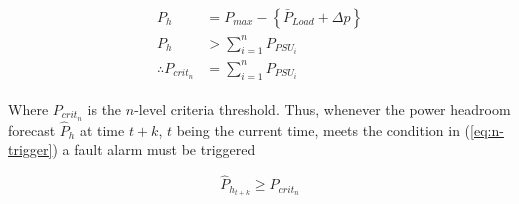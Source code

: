 \begin{align}
	\begin{split}
		P_{h} &= P_{max} - \left\{\bar{P}_{Load} + \Delta p \right\} \\
		P_{h} &> \sum_{i=1}^{n}{P_{PSU_i}} \\
		\therefore P_{crit_n} &= \sum_{i=1}^{n}{P_{PSU_i}}
	\end{split}
\end{align} 

Where $ P_{crit_n}$ is the $n$-level criteria threshold. Thus, whenever the power headroom forecast $\hat{P}_h$ at time $t+k$, $t$ being the current time, meets the condition in (\ref{eq:n-trigger}) a fault alarm must be triggered

\begin{equation}
	\label{eq:n-trigger}
	\hat{P}_{h_{t+k}} \geq P_{crit_n}
\end{equation}








